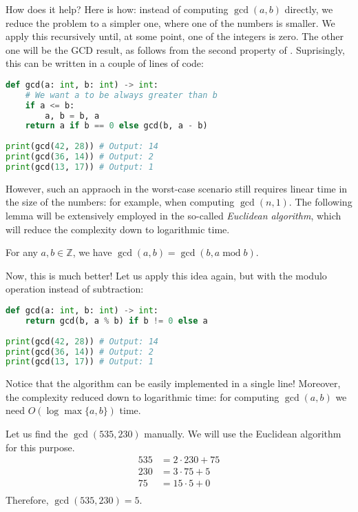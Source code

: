 \documentclass[../lecture-notes-148x210.tex]{subfiles}
\begin{document}
How does it help? Here is how: instead of computing $\gcd(a,b)$ directly, we
reduce the problem to a simpler one, where one of the numbers is smaller. We
apply this recursively until, at some point, one of the integers is zero. The
other one will be the GCD result, as follows from the second property of
. Suprisingly, this can be written in a couple of
lines of code:
\begin{lstlisting}[language=Python, numbers=none]
def gcd(a: int, b: int) -> int:
    # We want a to be always greater than b
    if a <= b:
        a, b = b, a
    return a if b == 0 else gcd(b, a - b)
    
print(gcd(42, 28)) # Output: 14
print(gcd(36, 14)) # Output: 2
print(gcd(13, 17)) # Output: 1

\end{lstlisting}

However, such an appraoch in the worst-case scenario still requires linear time
in the size of the numbers: for example, when computing $\gcd(n, 1)$. The following lemma will be extensively employed in
the so-called \textit{Euclidean algorithm}, which will reduce the complexity down
to logarithmic time.

\begin{corollary} \label{cor:euclidean}
    For any $a,b \in \mathbb{Z}$, we have 
    $\gcd(a,b) =\gcd(b, a \; \text{mod} \; b)$.
\end{corollary}

Now, this is much better! Let us apply this idea again, but with the modulo 
operation instead of subtraction:

\begin{lstlisting}[language=Python, numbers=none]
def gcd(a: int, b: int) -> int:
    return gcd(b, a % b) if b != 0 else a
    
print(gcd(42, 28)) # Output: 14
print(gcd(36, 14)) # Output: 2
print(gcd(13, 17)) # Output: 1
\end{lstlisting}

Notice that the algorithm can be easily implemented in a single line! Moreover,
the complexity reduced down to logarithmic time: for computing $\gcd(a,b)$ we
need $O(\log\max\{a, b\})$ time.

\begin{example}
    Let us find the $\gcd(535, 230)$ manually. We will use the Euclidean algorithm for this purpose.
    \hfill
    \begin{equation*}
        \begin{aligned}
            535 &= 2 \cdot 230 + 75 \\
            230 &= 3 \cdot 75 + 5 \\
            75 &= 15 \cdot 5 + 0 \\            
        \end{aligned}
    \end{equation*}
    Therefore, $\gcd(535, 230) = 5$.
\end{example}
\end{document}
